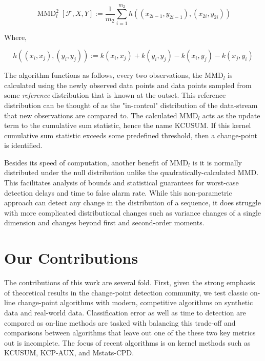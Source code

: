 $$\operatorname{MMD}_{l}^{2}[\mathcal{F}, X, Y] :=\frac{1}{m_{2}} \sum_{i=1}^{m_{2}} h\left(\left(x_{2 i-1}, y_{2 i-1}\right),\left(x_{2 i}, y_{2 i}\right)\right)$$

Where,

$$h\left((x_i, x_j), (y_i, y_j)\right):=k\left(x_{i}, x_{j}\right)+k\left(y_{i}, y_{j}\right)-k\left(x_{i}, y_{j}\right)-k\left(x_{j}, y_{i}\right)$$

The algorithm functions as follows, every two observations, the MMD$_l$ is calculated using the newly observed data points and data points sampled from some \textit{reference} distribution that is known at the outset. This reference distribution can be thought of as the "in-control" distribution of the data-stream that new observations are compared to. The calculated MMD$_l$ acts as the update term to the cumulative sum statistic, hence the name KCUSUM. If this kernel cumulative sum statistic exceeds some predefined threshold, then a change-point is identified. 

Besides its speed of computation, another benefit of MMD$_l$ is it is normally distributed under the null distribution unlike the quadratically-calculated MMD. This facilitates analysis of bounds and statistical guarantees for worst-case detection delays and time to false alarm rate. While this non-parametric approach can detect any change in the distribution of a sequence, it does struggle with more complicated distributional changes such as variance changes of a single dimension and changes beyond first and second-order moments.

 

\section{Our Contributions}
The contributions of this work are several fold. First, given the strong emphasis of theoretical results in the change-point detection community, we test classic on-line change-point algorithms with modern, competitive algorithms on synthetic data and real-world data. Classification error as well as time to detection are compared as on-line methods are tasked with balancing this trade-off and comparisons between algorithms that leave out one of the these two key metrics out is incomplete. The focus of recent algorithms is on kernel methods such as KCUSUM, KCP-AUX, and Mstats-CPD. 